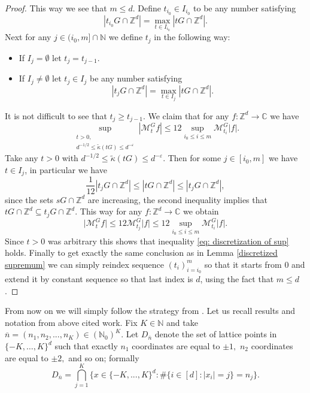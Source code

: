 \documentclass[a4paper,oneside, reqno]{amsart}
\numberwithin{equation}{section}
\theoremstyle{definition}%
\theoremstyle{definition}
\theoremstyle{definition}%
\theoremstyle{definition}
\newcommand{\Z}{\mathbb{Z}}
\newcommand{\C}{\mathbb{C}}
\newcommand{\N}{\mathbb{N}}
\begin{document}
\begin{proof}
This way we see that $m \le d$. Define $t_{i_0} \in I_{i_0}$ to be any number satisfying
\[
|t_{i_0} G \cap \Z^d|= \max_{t \in I_{i_0}} |t G \cap \Z^d|.
\]
Next for any $j \in (i_0,m] \cap \N$ we define $t_j$ in the following way: 
\begin{itemize}
    \item If $I_{j}= \emptyset$ let $t_j=t_{j-1}$.
    \item If $I_{j} \neq \emptyset$ let $t_j \in I_j$ be any number satisfying
    \[
    |t_{j} G \cap \Z^d|= \max_{t \in I_j} |t G \cap \Z^d|.
    \]
\end{itemize}
It is not difficult to see that $t_j \ge t_{j-1}$.
We claim that for any $f: \Z^d \to \C$ we have
\begin{equation} \label{eq: discretization of sup}
    \sup_{\substack{t>0, \\
d^{-1/2} \le \widetilde{\kappa}(tG) \le d^{-\varepsilon}}} |\mathcal{M}_{t}^Gf| \le 12 \sup_{i_0 \le i \le m} \mathcal{M}_{t_i}^G|f|.
\end{equation}
Take any $t>0$ with $d^{-1/2} \le \widetilde{\kappa}(tG) \le d^{-\varepsilon}$. Then for some $j \in [i_0,m]$ we have $t \in I_j$, in particular we have
\[
\frac{1}{12}|t_jG \cap \Z^d| \le |tG \cap \Z^d| \le |t_jG \cap \Z^d|,
\]
since the sets $sG \cap \Z^d$ are increasing, the second inequality implies that $tG \cap \Z^d \subseteq t_j G \cap \Z^d$. This way for any $f:\Z^d \to \C$ we obtain
\[
\big|\mathcal{M}_t^G f \big| \le 12 \mathcal{M}_{t_j}^G |f| \le  12 \sup_{i_0 \le i \le m} \mathcal{M}_{t_i}^G|f|.
\]
Since $t>0$ was arbitrary this shows that inequality \eqref{eq: discretization of sup} holds. Finally to get exactly the same conclusion as in Lemma \ref{discretized supremum} we can simply reindex sequence $(t_i)_{i=i_0}^m$ so that it starts from $0$ and extend it by constant sequence so that last index is $d$, using the fact that $m \le d$.  
\end{proof}
From now on we will simply follow the strategy from \cite[Section 4]{NW}. Let us recall results and notation from above cited work.  Fix $K \in \N$ and take $\overline{n}=(n_1,n_2,...,n_K) \in (\N_0)^K.$ Let $D_{\overline{n}}$ denote the set of lattice points in $\{-K,\ldots,K\}^d$ such that exactly $n_1$ coordinates are equal to $\pm 1,$ $n_2$ coordinates are equal to $\pm 2,$ and so on; formally
\begin{equation}
\label{eq:def Dn}
D_{\overline{n}}= \bigcap_{j=1}^K\Big\{ x \in \{-K,...,K\}^d:  \#\{i \in [d]: |x_i|=j\}=n_j \Big\}.
\end{equation}
\end{document}
